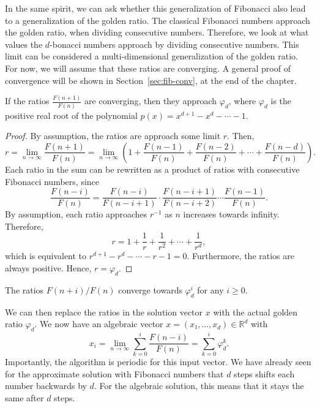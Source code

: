 In the same spirit,
we can ask whether this generalization of Fibonacci also lead to a generalization of the golden ratio.
The classical Fibonacci numbers approach the golden ratio, when dividing consecutive numbers.
Therefore, we look at what values the $d$-bonacci numbers approach by dividing consecutive numbers.
This limit can be considered a multi-dimensional generalization of the golden ratio.
For now, we will assume that these ratios are converging.
A general proof of convergence will be shown in Section~\ref{sec:fib-conv}, at the end of the chapter.

\begin{theorem}
  If the ratios $\frac{F(n+1)}{F(n)}$ are converging, then they approach $φ_d$,
  where $φ_d$ is the positive real root of the polynomial $p(x) = x^{d+1} - x^d - ⋯ - 1$.
\end{theorem}

\begin{proof}
  By assumption, the ratios are approach some limit $r$.
  Then,
  \[
    r
    = \lim_{n → ∞} \frac{F(n+1)}{F(n)}
    = \lim_{n → ∞} \left(1 + \frac{F(n-1)}{F(n)} + \frac{F(n-2)}{F(n)} + ⋯ + \frac{F(n-d)}{F(n)}\right).
  \]
  Each ratio in the sum can be rewritten as a product of ratios with
  consecutive Fibonacci numbers, since
  \[
    \frac{F(n - i)}{F(n)}
    = \frac{F(n - i)}{F(n - i + 1)} · \frac{F(n - i + 1)}{F(n - i + 2)} ⋯ \frac{F(n - 1)}{F(n)}.
  \]
  By assumption, each ratio approaches $r^{-1}$ as $n$ increases towards infinity.
  Therefore,
  \[
    r = 1 + \frac{1}{r} + \frac{1}{r^2} + ⋯ + \frac{1}{r^d},
  \]
  which is equivalent to $r^{d+1} - r^d - ⋯ - r - 1 = 0$.
  Furthermore, the ratios are always positive.
  Hence, $r = φ_d$.
\end{proof}

\begin{corollary}
  The ratios $F(n + i)/F(n)$ converge towards $φ_d^i$ for any $i ≥ 0$.
\end{corollary}

We can then replace the ratios in the solution vector $x$ with the actual golden ratio $φ_d$.
We now have an algebraic vector $x = (x₁, …, x_d) ∈ ℝ^d$ with
\[
  x_i
  = \lim_{n → ∞} \sum_{k=0}^i \frac{F(n - i)}{F(n)}
  = \sum_{k=0}^i φ_d^k.
\]
Importantly, the algorithm is periodic for this input vector.
We have already seen for the approximate solution with Fibonacci numbers
that $d$ steps shifts each number backwards by $d$.
For the algebraic solution, this means that it stays the same after $d$ steps.

